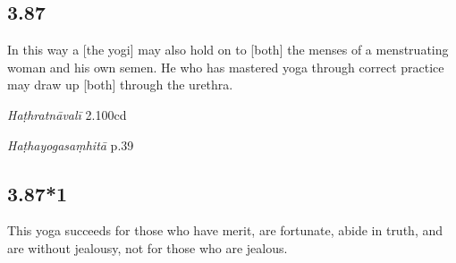 \begin{ekdosis}
\subsection*{3.87}
\begin{translation}[hp03_087]
In this way a [the yogi] may also hold on to [both] the menses of a menstruating woman and his own semen. He who has mastered yoga through correct practice may draw up [both] through the urethra.
\end{translation}



\begin{testimonia}[hp03_087]
\emph{Haṭhratnāvalī} 2.100cd
\begin{versinnote}
\end{versinnote}

\emph{Haṭhayogasaṃhitā} p.39
\begin{versinnote}
\end{versinnote}
\end{testimonia}

\begin{philcomm}[hp03_087]
\end{philcomm}



\subsection*{3.87*1}
\begin{translation}[hp03_087_1]
This yoga succeeds for those who have merit, are fortunate, abide in truth, and are without jealousy, not for those who are jealous.
\end{translation}


\end{ekdosis}
